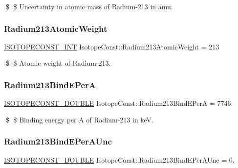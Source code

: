 \$ \$ Uncertainty in atomic mass of Radium-\/213 in amu. \mbox{\label{group___isotope_const-_radium-_ra213_ga5f3e116866637929f8df0e2f1b08d224}} 
\subsubsection{\texorpdfstring{Radium213\+Atomic\+Weight}{Radium213AtomicWeight}}
{\footnotesize\ttfamily \mbox{\hyperlink{group___isotope_const-_macros_ga5f18360b3e99483a35c32d789e62621c}{I\+S\+O\+T\+O\+P\+E\+C\+O\+N\+S\+T\+\_\+\+I\+NT}} Isotope\+Const\+::\+Radium213\+Atomic\+Weight = 213}

\$ \$ Atomic weight of Radium-\/213. \mbox{\label{group___isotope_const-_radium-_ra213_ga05e37cb12a06f61fbec3bcdd26ab5b97}} 
\subsubsection{\texorpdfstring{Radium213\+Bind\+E\+PerA}{Radium213BindEPerA}}
{\footnotesize\ttfamily \mbox{\hyperlink{group___isotope_const-_macros_ga8f45a7272ce02c0b4c65c44636ed719a}{I\+S\+O\+T\+O\+P\+E\+C\+O\+N\+S\+T\+\_\+\+D\+O\+U\+B\+LE}} Isotope\+Const\+::\+Radium213\+Bind\+E\+PerA = 7746.}

\$ \$ Binding energy per A of Radium-\/213 in keV. \mbox{\label{group___isotope_const-_radium-_ra213_ga9b39f7fe738cd6eb32c37302e6140ab3}} 
\subsubsection{\texorpdfstring{Radium213\+Bind\+E\+Per\+A\+Unc}{Radium213BindEPerAUnc}}
{\footnotesize\ttfamily \mbox{\hyperlink{group___isotope_const-_macros_ga8f45a7272ce02c0b4c65c44636ed719a}{I\+S\+O\+T\+O\+P\+E\+C\+O\+N\+S\+T\+\_\+\+D\+O\+U\+B\+LE}} Isotope\+Const\+::\+Radium213\+Bind\+E\+Per\+A\+Unc = 0.}

